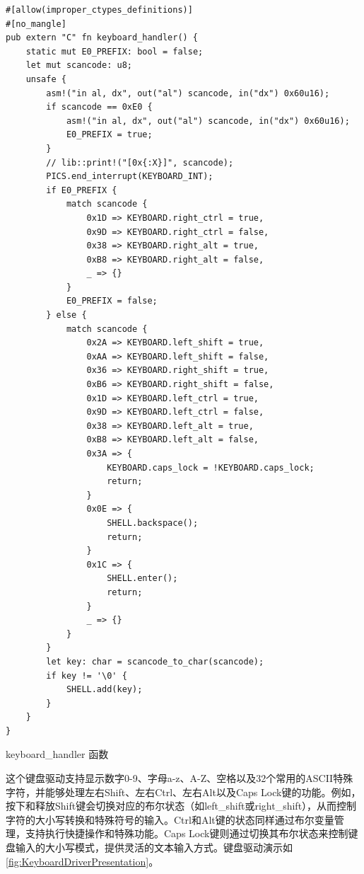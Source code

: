 \begin{listing}[htbp]
    \begin{verbatim}
#[allow(improper_ctypes_definitions)]
#[no_mangle]
pub extern "C" fn keyboard_handler() {
    static mut E0_PREFIX: bool = false;
    let mut scancode: u8;
    unsafe {
        asm!("in al, dx", out("al") scancode, in("dx") 0x60u16);
        if scancode == 0xE0 {
            asm!("in al, dx", out("al") scancode, in("dx") 0x60u16);
            E0_PREFIX = true;
        }
        // lib::print!("[0x{:X}]", scancode);
        PICS.end_interrupt(KEYBOARD_INT);
        if E0_PREFIX {
            match scancode {
                0x1D => KEYBOARD.right_ctrl = true,
                0x9D => KEYBOARD.right_ctrl = false,
                0x38 => KEYBOARD.right_alt = true,
                0xB8 => KEYBOARD.right_alt = false,
                _ => {}
            }
            E0_PREFIX = false;
        } else {
            match scancode {
                0x2A => KEYBOARD.left_shift = true,
                0xAA => KEYBOARD.left_shift = false,
                0x36 => KEYBOARD.right_shift = true,
                0xB6 => KEYBOARD.right_shift = false,
                0x1D => KEYBOARD.left_ctrl = true,
                0x9D => KEYBOARD.left_ctrl = false,
                0x38 => KEYBOARD.left_alt = true,
                0xB8 => KEYBOARD.left_alt = false,
                0x3A => {
                    KEYBOARD.caps_lock = !KEYBOARD.caps_lock;
                    return;
                }
                0x0E => {
                    SHELL.backspace();
                    return;
                }
                0x1C => {
                    SHELL.enter();
                    return;
                }
                _ => {}
            }
        }
        let key: char = scancode_to_char(scancode);
        if key != '\0' {
            SHELL.add(key);
        }
    }
}
    \end{verbatim}
    \caption{keyboard\_handler 函数}\label{lst:KeyboardHandlerFunction}
\end{listing}

这个键盘驱动支持显示数字0-9、字母a-z、A-Z、空格以及32个常用的ASCII特殊字符，并能够处理左右Shift、左右Ctrl、左右Alt以及Caps Lock键的功能。例如，按下和释放Shift键会切换对应的布尔状态（如left\_shift或right\_shift），从而控制字符的大小写转换和特殊符号的输入。Ctrl和Alt键的状态同样通过布尔变量管理，支持执行快捷操作和特殊功能。Caps Lock键则通过切换其布尔状态来控制键盘输入的大小写模式，提供灵活的文本输入方式。键盘驱动演示如\cref{fig:KeyboardDriverPresentation}。

